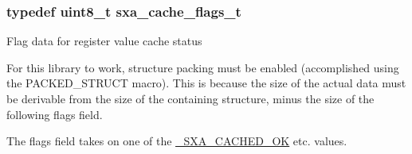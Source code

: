 \hypertarget{group___s_x_a_ga21b45e50d83fcc1363c4239313e88c06}{
\subsubsection[{sxa\-\_\-cache\-\_\-flags\-\_\-t}]{ typedef {\bf uint8\-\_\-t} sxa\-\_\-cache\-\_\-flags\-\_\-t}}\label{group___s_x_a_ga21b45e50d83fcc1363c4239313e88c06}
\begin{DoxyVerb}\internal Flag data for register value cache status
\end{DoxyVerb}


For this library to work, structure packing must be enabled (accomplished using the P\-A\-C\-K\-E\-D\-\_\-\-S\-T\-R\-U\-C\-T macro). This is because the size of the actual data must be derivable from the size of the containing structure, minus the size of the following flags field.

The flags field takes on one of the \hyperlink{group___s_x_a_gga0411cd49bb5b71852cecd93bcbf0ca2da54498f64b3ad7c2be423d32b45deac04}{\-\_\-\-S\-X\-A\-\_\-\-C\-A\-C\-H\-E\-D\-\_\-\-O\-K} etc. values. 
